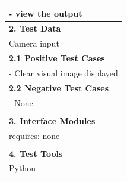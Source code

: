 \documentclass[12pt,a4paper,man]{report}
\begin{document}
\begin{longtable}{|p{7in}|}
- view the output\\
\hline
\textbf{2. Test Data}\\
\hline
Camera input\\
\hline
\textbf{2.1 Positive Test Cases}\\
\hline
- Clear visual image displayed\\
\hline
\textbf{2.2 Negative Test Cases}\\
\hline
- None\\
\\
\hline
\textbf{3. Interface Modules}\\
\hline
requires: none\\
\\
\hline
\textbf{4. Test Tools}\\
\hline
Python\\
\hline
\end{longtable}
\end{document}

